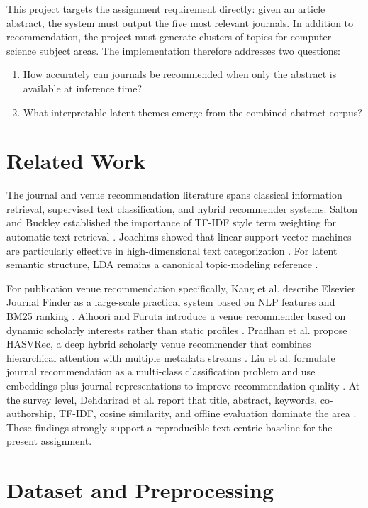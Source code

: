 \documentclass[conference]{IEEEtran}
\begin{document}
This project targets the assignment requirement directly: given an article abstract, the system must output the five most relevant journals. In addition to recommendation, the project must generate clusters of topics for computer science subject areas. The implementation therefore addresses two questions:
\begin{enumerate}
\item How accurately can journals be recommended when only the abstract is available at inference time?
\item What interpretable latent themes emerge from the combined abstract corpus?
\end{enumerate}

\section{Related Work}
The journal and venue recommendation literature spans classical information retrieval, supervised text classification, and hybrid recommender systems. Salton and Buckley established the importance of TF-IDF style term weighting for automatic text retrieval \cite{salton1988term}. Joachims showed that linear support vector machines are particularly effective in high-dimensional text categorization \cite{joachims1998svm}. For latent semantic structure, LDA remains a canonical topic-modeling reference \cite{blei2003lda}.

For publication venue recommendation specifically, Kang et al. describe Elsevier Journal Finder as a large-scale practical system based on NLP features and BM25 ranking \cite{kang2015elsevier}. Alhoori and Furuta introduce a venue recommender based on dynamic scholarly interests rather than static profiles \cite{alhoori2017dynamic}. Pradhan et al. propose HASVRec, a deep hybrid scholarly venue recommender that combines hierarchical attention with multiple metadata streams \cite{pradhan2020hasvrec}. Liu et al. formulate journal recommendation as a multi-class classification problem and use embeddings plus journal representations to improve recommendation quality \cite{liu2022embedding}. At the survey level, Dehdarirad et al. report that title, abstract, keywords, co-authorship, TF-IDF, cosine similarity, and offline evaluation dominate the area \cite{dehdarirad2020survey}. These findings strongly support a reproducible text-centric baseline for the present assignment.

\section{Dataset and Preprocessing}
\end{document}
